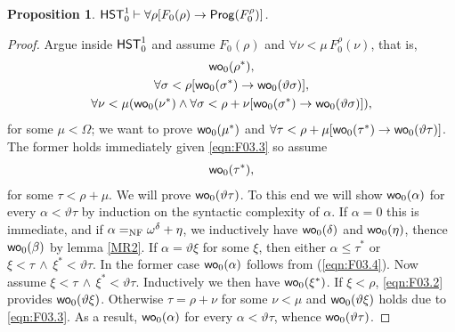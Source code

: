 \documentclass[UKenglish,cleveref,DIV=12]{scrartcl}
\newtheorem{proposition}[lemma]{Proposition}
\theoremstyle{definition}
\theoremstyle{definition}
\newcommand{\kommentar}[1]{}
\begin{document}
\begin{proposition}\label{prop:F0genwellordering}
  $\mathsf{HST}_0^1\vdash \forall\rho[F_0(\rho)\rightarrow \mathsf{Prog} ( F_0^\rho)]$.
\end{proposition}
\begin{proof}
Argue inside $\mathsf{HST}_0^1$ and assume $F_0(\rho)$ and $\forall\nu<\mu\,F_0^\rho(\nu)$, that is,
\begin{gather}
  \mathsf{wo}_0(\rho^*),\label{eqn:F03.1}\\
  \forall\sigma<\rho[\mathsf{wo}_0(\sigma^*)\rightarrow\mathsf{wo}_0(\vartheta\sigma)],\label{eqn:F03.2}\\
  \forall\nu<\mu(\mathsf{wo}_0(\nu^*)\land\forall\sigma<\rho+\nu[\mathsf{wo}_0(\sigma^*)\rightarrow \mathsf{wo}_0(\vartheta\sigma)]),\label{eqn:F03.3}
\end{gather}
for some $\mu<\Omega$; we want to prove $\mathsf{wo}_0(\mu^*)$ and $\forall\tau<\rho+\mu[\mathsf{wo}_0(\tau^*)\rightarrow \mathsf{wo}_0(\vartheta\tau)]$. The former holds immediately given \eqref{eqn:F03.3} so assume
\begin{gather}
  \mathsf{wo}_0(\tau^*),\label{eqn:F03.4}
\end{gather}
for some $\tau<\rho+\mu$. We will prove $\mathsf{wo}_0(\vartheta\tau)$. To this end we will show $\mathsf{wo}_0(\alpha)$ for every $\alpha<\vartheta\tau$ by induction on the syntactic complexity of $\alpha$. If $\alpha=0$ this is immediate, and if $\alpha=_{\mathrm{NF}}\omega^\delta+\eta$, we inductively have  $ \mathsf{wo}_0(\delta)$ and 
$\mathsf{wo}_0(\eta)$,
 thence  $\mathsf{wo}_0(\beta)$ by lemma \ref{MR2}.
 If $\alpha=\vartheta \xi$ for some $\xi$, then either $\alpha\leq\tau ^*$ or $\xi<\tau\,\wedge\,\xi^*<\vartheta\tau$.  In the former case $\mathsf{wo}_0(\alpha)$ follows from (\ref{eqn:F03.4}).  Now assume $\xi<\tau\,\wedge\,\xi^*<\vartheta\tau$. Inductively we then have $\mathsf{wo}_0(\xi^*)$.
 If $\xi<\rho$,
\eqref{eqn:F03.2} provides $\mathsf{wo}_0(\vartheta\xi)$. Otherwise $\tau=\rho+\nu$
for some $\nu<\mu$ and $\mathsf{wo}_0(\vartheta\xi)$ holds due to \eqref{eqn:F03.3}.
As a result,
 $\mathsf{wo}_0(\alpha)$ for every
$\alpha<\vartheta\tau$, whence $\mathsf{wo}_0(\vartheta\tau)$.
% 
% 
\kommentar{
 $ (\Omega\cdot m)^*=0$. Hence $\xi=\Omega\cdot n+\alpha$ for some $n<m$, and
$\HST_0^m\proves\wo_0(\bar\xi^*)$ by the induction hypothesis, whence
\cref{prop:F0wellordering} implies $\HST_0^m\proves\wo_0(\bar\beta)$.



}
\end{proof}
\end{document}

